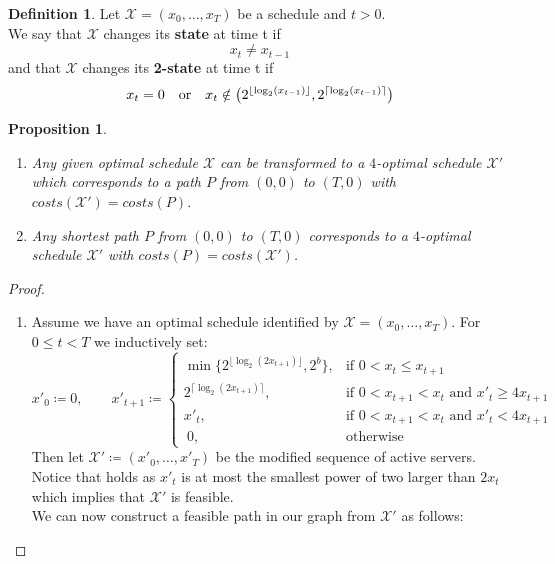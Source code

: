 \documentclass[hidelinks]{article}
\theoremstyle{plain}
\newtheorem{prop}[thm]{Proposition}
\theoremstyle{definition}
\newtheorem{defn}[thm]{Definition}
\theoremstyle{rem}
\newcommand{\mx}{\mathcal{X}}
\begin{document}
\begin{sloppypar}
\begin{defn}
Let $\mx=(x_0,\ldots,x_T)$ be a schedule and $t>0$.\\
We say that $\mx$ changes its \textbf{state} at time t if
\begin{equation*}
	x_t\neq x_{t-1}
\end{equation*}
and that $\mx$ changes its \textbf{2-state} at time t if
\begin{equation*}
	x_t=0\text{\quad or\quad}x_t\notin\bigl(2^{\lfloor \log_2(x_{t-1})\rfloor},2^{\lceil \log_2(x_{t-1})\rceil}\bigr)
\end{equation*}
\end{defn}
\begin{prop}
$ $
\begin{enumerate}
	\item\label{prop:2opt} Any given optimal schedule $\mx$ can be transformed to a $4$-optimal schedule $\mx'$ which corresponds to a path $P$ from $(0,0)$ to $(T,0)$ with $costs(\mx')=costs(P)$.
	\item Any shortest path $P$ from $(0,0)$ to $(T,0)$ corresponds to a $4$-optimal schedule $\mx'$ with $costs(P)=costs(\mx')$.
\end{enumerate}
\end{prop}
\begin{proof}
$ $
\begin{enumerate}
	\item Assume we have an optimal schedule identified by $\mx=(x_0,\ldots,x_T)$. For $0\le t<T$ we inductively set:
\begin{equation}
	x'_0\coloneqq 0,\qquad
	x'_{t+1}\coloneqq 
	\begin{cases}
		\min\bigl\{2^{\lfloor \log_2(2x_{t+1})\rfloor},2^b\bigr\}, & \text{if $0<x_t\le x_{t+1}$}\\
		2^{\lceil \log_2(2x_{t+1})\rceil}, & \text{if $0<x_{t+1}<x_t$ and $x'_{t}\ge4x_{t+1}$}\\
		x'_t, & \text{if $0<x_{t+1}<x_t$ and $x'_{t}<4x_{t+1}$}\\
		\		   0, & \text{otherwise}
	\end{cases} \label{def:xprime}
\end{equation}
Then let $\mx'\coloneqq(x'_0,\ldots,x'_T)$ be the modified sequence of active servers. Notice that  holds as $x'_t$ is at most the smallest power of two larger than $2x_t$ which implies that $\mx'$ is feasible.\\
We can now construct a feasible path in our graph from $\mathcal{X'}$ as follows:

\end{enumerate}
\end{proof}
\end{sloppypar}
\end{document}
